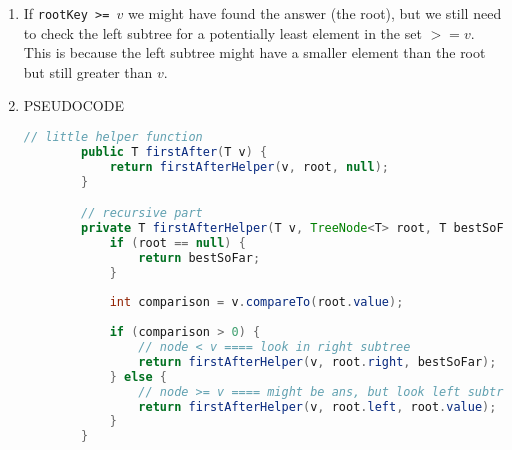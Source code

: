 \documentclass[../main.tex]{subfiles}
\begin{document}
\begin{enumerate}
    \item If \texttt{rootKey >= $v$} we might have found the answer (the root),
    but we still need to check the left subtree for a potentially least element in the set $>= v$.
    This is because the left subtree might have a smaller element than the root but still greater
    than $v$.
    
    \item PSEUDOCODE
    \begin{lstlisting}[language=Java]
        // little helper function 
        public T firstAfter(T v) {
            return firstAfterHelper(v, root, null);
        }

        // recursive part
        private T firstAfterHelper(T v, TreeNode<T> root, T bestSoFar) {
            if (root == null) {
                return bestSoFar; 
            }
            
            int comparison = v.compareTo(root.value);
            
            if (comparison > 0) {
                // node < v ==== look in right subtree
                return firstAfterHelper(v, root.right, bestSoFar);
            } else {
                // node >= v ==== might be ans, but look left subtree
                return firstAfterHelper(v, root.left, root.value);
            }
        }
    \end{lstlisting}
\end{enumerate}
\end{document}
